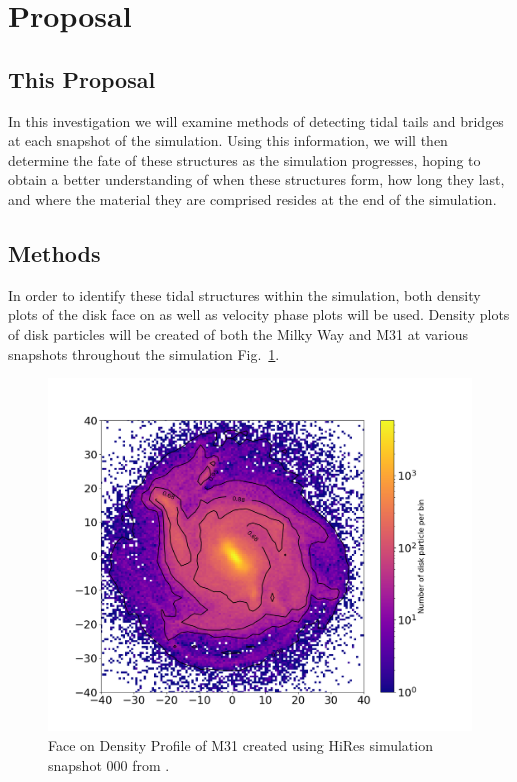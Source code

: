 \documentclass[fleqn,usenatbib]{mnras}
\begin{document}
\section{Proposal}

\subsection{This Proposal}
\label{sec:Proposal} %

In this investigation we will examine methods of detecting tidal tails and bridges at each snapshot of the simulation. 
Using this information, we will then determine the fate of these structures as the simulation progresses, hoping to obtain a better understanding of when these structures form, how long they last, and where the material they are comprised resides at the end of the simulation.

\subsection{Methods}

In order to identify these tidal structures within the simulation, both density plots of the disk face on as well as velocity phase plots will be used. 
Density plots of disk particles will be created of both the Milky Way and M31 at various snapshots throughout the simulation Fig.~\ref{fig:FaceOn_density}.

\begin{figure}
	\includegraphics[width=\columnwidth]{FaceOn_Density.png}
    \caption{Face on Density Profile of M31 created using HiRes simulation snapshot 000 from \cite{van_der_Marel_Besla_2012}.}
    \label{fig:FaceOn_density}
\end{figure}
\end{document}
